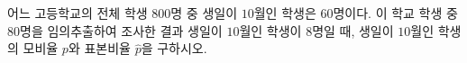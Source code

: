 어느 고등학교의 전체 학생 $800$명 중 생일이 $10$월인 학생은 $60$명이다. 이 학교 학생 중 $80$명을 임의추출하여 조사한 결과 생일이 $10$월인 학생이 $8$명일 때, 생일이 $10$월인 학생의 모비율 $p$와 표본비율 $\hat{p}$을 구하시오.
